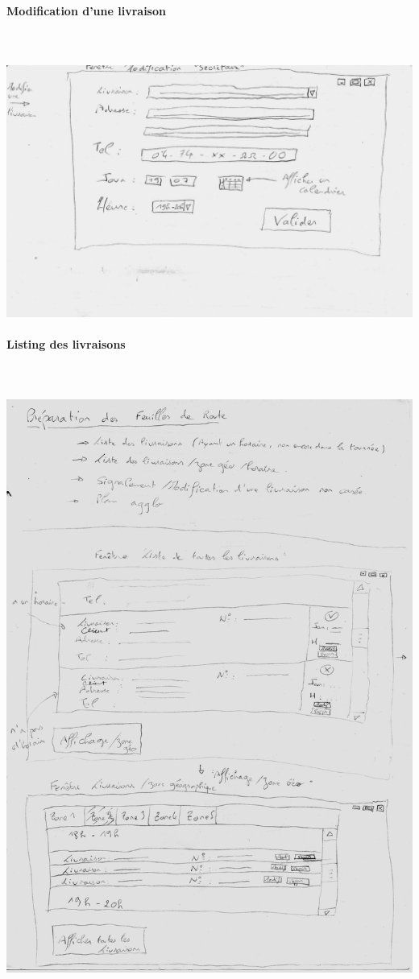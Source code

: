 \documentclass{report}
\begin{document}
\begin{appendices}
\paragraph{Modification d'une livraison}
~~\\
~~\\
\includegraphics[scale = 0.7]{images/croquismodif.jpg}

\pagebreak

\paragraph{Listing des livraisons}
~~\\
~~\\
\includegraphics[scale = 0.55]{images/croquisfeuille.jpg}


\end{appendices}
\end{document}
